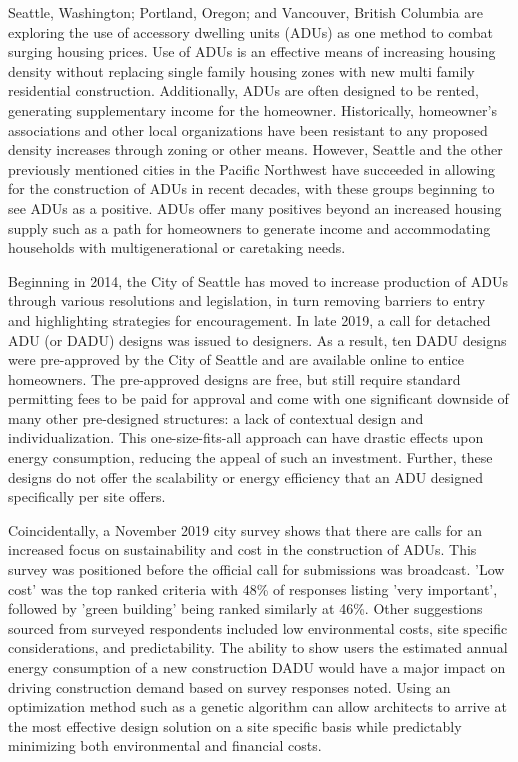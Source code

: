 \documentclass[sagev,times,Royal]{sagej}
\begin{document}
Seattle, Washington; Portland, Oregon; and Vancouver, British Columbia are exploring the use of accessory dwelling units (ADUs) as one method to combat surging housing prices. Use of ADUs is an effective means of increasing housing density without replacing single family housing zones with new multi family residential construction. Additionally, ADUs are often designed to be rented, generating supplementary income for the homeowner. Historically, homeowner’s associations and other local organizations have  been resistant to any proposed density increases through zoning or other means\cite{10.2307/24392672}. However, Seattle and the other previously mentioned cities in the Pacific Northwest have succeeded in allowing for the construction of ADUs in recent decades, with these groups beginning to see ADUs as a positive. ADUs offer many positives beyond an increased housing supply such as a path for homeowners to generate income and accommodating households with multigenerational or caretaking needs.

Beginning in 2014, the City of Seattle has moved to increase production of ADUs through various resolutions and legislation, in turn removing barriers to entry and highlighting strategies for encouragement. In late 2019, a call for detached ADU (or DADU) designs was issued to designers. As a result, ten DADU designs were pre-approved by the City of Seattle and are available online to entice homeowners\cite{ADUniversePreapprovedADU}. The pre-approved designs are free, but still require standard permitting fees to be paid for approval and come with one significant downside of many other pre-designed structures: a lack of contextual design and individualization. This one-size-fits-all approach can have drastic effects upon energy consumption, reducing the appeal of such an investment. Further, these designs do not offer the scalability or energy efficiency that an ADU designed specifically per site offers.

 Coincidentally, a November 2019 city survey shows that there are calls for an increased focus on sustainability and cost in the construction of ADUs\cite{seattlePreapprovedPlansAccessory2019}. This survey was positioned before the official call for submissions was broadcast. 'Low cost' was the top ranked criteria with 48\% of responses listing 'very important', followed by 'green building' being ranked similarly at 46\%. Other suggestions sourced from surveyed respondents included low environmental costs, site specific considerations, and predictability. The ability to show users the estimated annual energy consumption of a new construction DADU would have a major impact on driving construction demand based on survey responses noted. Using an optimization method such as a genetic algorithm can allow architects to arrive at the most effective design solution on a site specific basis while predictably minimizing both environmental and financial costs. 
 
\end{document}
